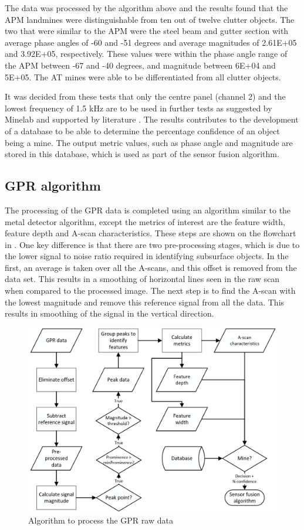 \documentclass[main.tex]{subfiles}
\begin{document}
The data was processed by the algorithm above and the results found that the APM landmines were distinguishable from ten out of twelve clutter objects. The two that were similar to the APM were the steel beam and gutter section with average phase angles of -60 and -51 degrees and average magnitudes of 2.61E+05 and 3.92E+05, respectively. These values were within the phase angle range of the APM between -67 and -40 degrees, and magnitude between 6E+04 and 5E+05. The AT mines were able to be differentiated from all clutter objects. 

It was decided from these tests that only the centre panel (channel 2) and the lowest frequency of 1.5 kHz are to be used in further tests as suggested by Minelab and supported by literature \parencite{bruschini02}. The results contributes to the development of a database to be able to determine the percentage confidence of an object being a mine. The output metric values, such as phase angle and magnitude are stored in this database, which is used as part of the sensor fusion algorithm. 

\subsection{GPR algorithm}
The processing of the GPR data is completed using an algorithm similar to the metal detector algorithm, except the metrics of interest are the feature width, feature depth and A-scan characteristics. These steps are shown on the flowchart in . One key difference is that there are two pre-processing stages, which is due to the lower signal to noise ratio required in identifying subsurface objects.  In the first, an average is taken over all the A-scans, and this offset is removed from the data set. This results in a smoothing of horizontal lines seen in the raw scan when compared to the processed image. The next step is to find the A-scan with the lowest magnitude and remove this reference signal from all the data. This results in smoothing of the signal in the vertical direction.

\begin{figure}[ht]
\includegraphics[width=\textwidth]{4-DetailedDesign/GPRflow.PNG}
\centering
\caption{Algorithm to process the GPR raw data}
\end{figure}
\end{document}
